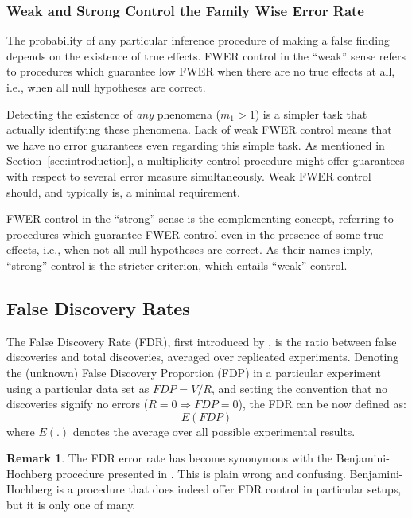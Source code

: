 \documentclass[review,12pt]{article}
\theoremstyle{definition}
\theoremstyle{definition}
\newtheorem{remark}{Remark}[section]
\begin{document}
\subsubsection{Weak and Strong Control the Family Wise Error Rate}
The probability of any particular inference procedure of making a false finding depends on the existence of true effects. FWER control in the ``weak'' sense refers to procedures which guarantee low FWER when there are no true effects at all, i.e., when all null hypotheses are correct. 

Detecting the existence of \emph{any} phenomena ($m_1>1$) is a simpler task that actually identifying these phenomena. Lack of weak FWER control means that we have no error guarantees even regarding this simple task. 
As mentioned in Section~\ref{sec:introduction}, a multiplicity control procedure might offer guarantees with respect to several error measure simultaneously. Weak FWER control should, and typically is, a minimal requirement. 

FWER control in the ``strong'' sense is the complementing concept, referring to procedures which guarantee FWER control even in the presence of some true effects, i.e., when not all null hypotheses are correct. 
As their names imply, ``strong'' control is the stricter criterion, which entails ``weak'' control.




\subsection{\label{sub:fdr}False Discovery Rates}

The False Discovery Rate (FDR), first introduced by \citet{benjamini_controlling_1995}, is the ratio between false discoveries and total discoveries, averaged over replicated experiments. 
Denoting the (unknown) False Discovery Proportion (FDP) in a particular experiment using a particular data set as $ FDP=V/R $, and setting the convention that no discoveries signify no errors ($R=0 \Rightarrow FDP=0$), the FDR can be now defined as:
$$E \left( FDP \right)$$ 
where $E(.)$ denotes the average over all possible experimental results.


\begin{remark}
The FDR error rate has become synonymous with the Benjamini-Hochberg procedure presented in \citep{benjamini_controlling_1995} . This is plain wrong and confusing. Benjamini-Hochberg is a procedure that does indeed offer FDR control in particular setups, but it is only one of many.
\end{remark}
\end{document}
